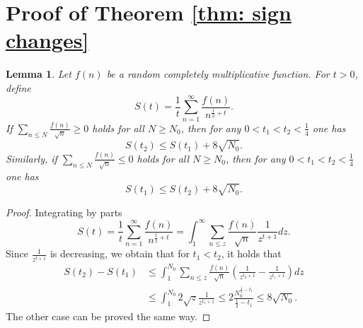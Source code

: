 \documentclass[12pt]{amsart}
\newtheorem{lemma}[theorem]{Lemma}
\theoremstyle{remark}
\theoremstyle{definition}
\theoremstyle{remark}
\numberwithin{equation}{section}
\begin{document}
\section{Proof of Theorem \ref{thm: sign changes}}



\begin{lemma} \label{almostdecreasing}
Let $f(n)$ be a random completely multiplicative function. For $t>0$, define 
 $$S(t) = \frac{1}{t} \sum_{n=1}^{\infty} \frac{f(n)}{n^{\frac{1}{2}+t}}.$$
If $\sum_{n \le N} \frac{f(n)}{\sqrt{n}} \ge 0$ holds for all $N \ge N_0$, then for any $0<t_1<t_2<\frac{1}{4}$ one has
$$S(t_2)\le S(t_1)+8 \sqrt{N_0}.$$
Similarly, if $\sum_{n \le N} \frac{f(n)}{\sqrt{n}} \le 0$ holds for all $N \ge N_0$, then for any $0<t_1<t_2<\frac{1}{4}$ one has
$$S(t_1)\le S(t_2)+8 \sqrt{N_0}.$$
\end{lemma}

\begin{proof}
Integrating by parts
    $$S(t) = \frac{1}{t}\sum_{n=1}^{\infty}\frac{f(n)}{n^{\frac{1}{2}+t}} = \int_{1}^\infty \sum_{n \le z} \frac{f(n)}{\sqrt{n}} \frac{1}{z^{t+1}}dz.$$
Since $\frac{1}{z^{t+1}}$ is decreasing, we obtain that for $t_1<t_2$, it holds that
\begin{equation*}
    \begin{split}
 S(t_2)-S(t_1) &\le \int_{1}^{N_0} \sum_{n \le z} \frac{f(n)}{\sqrt{n}} \left(\frac{1}{z^{t_2+1}}-\frac{1}{z^{t_1+1}}\right)dz\\& \le  \int_1^{N_0} 2\sqrt{z}\frac{1}{z^{t_1+1}} \le 2\frac{N_0^{\frac{1}{2}-t_1}}{\frac{1}{2}-t_1} \le  8 \sqrt{N_0}  .     
    \end{split}
\end{equation*}
The other case can be proved the same way.
\end{proof}
\end{document}
